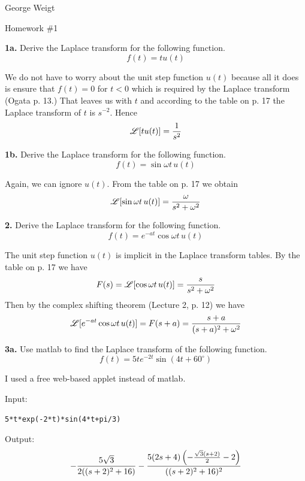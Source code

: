 \documentclass[11pt]{report}
\begin{document}
\noindent
George Weigt

\noindent
Homework \#1

\bigskip
\noindent
{\bf 1a.} Derive the Laplace transform for the following function.
$$f(t)=tu(t)$$

\bigskip
\noindent
We do not have to worry about the unit step function $u(t)$ because all
it does is ensure that $f(t) = 0$ for $t<0$ which is required by the
Laplace transform
(Ogata p. 13.)
That leaves us with $t$ and according to the table on p. 17
the Laplace transform of $t$ is $s^{-2}$.
Hence
$${\mathscr L}[tu(t)]={1\over s^2}$$

\bigskip
\noindent
{\bf 1b.} Derive the Laplace transform for the following function.
$$f(t)=\sin\omega t\,u(t)$$

\bigskip
\noindent
Again, we can ignore $u(t)$.
From the table on p. 17 we obtain
$${\mathscr L}[\sin\omega t\,u(t)]={\omega\over s^2+\omega^2}$$

\bigskip
\noindent
{\bf 2.} Derive the Laplace transform for the following function.
$$f(t)=e^{-at}\cos\omega t\,u(t)$$

\bigskip
\noindent
The unit step function $u(t)$ is implicit in the Laplace transform tables.
By the table on p. 17 we have
$$F(s)={\mathscr L}[\cos\omega t\,u(t)]={s\over s^2+\omega^2}$$
Then by the complex shifting theorem (Lecture 2, p. 12) we have
$${\mathscr L}[e^{-at}\cos\omega t\,u(t)]=F(s+a)={s+a\over (s+a)^2+\omega^2}$$

\newpage

\noindent
{\bf 3a.} Use {\sc matlab} to find the Laplace transform of the following
function.
$$f(t)=5te^{-2t}\sin(4t+60^\circ)$$

\bigskip
\noindent
I used a free web-based applet instead of {\sc matlab}.

\bigskip
\noindent
Input:
\begin{center}
\verb$5*t*exp(-2*t)*sin(4*t+pi/3)$
\end{center}

\bigskip
\noindent
Output:
$$-{5\sqrt3\over2((s+2)^2+16)}
-{5(2s+4)\left(-{\sqrt3(s+2)\over2}-2\right)\over((s+2)^2+16)^2}$$
\end{document}
